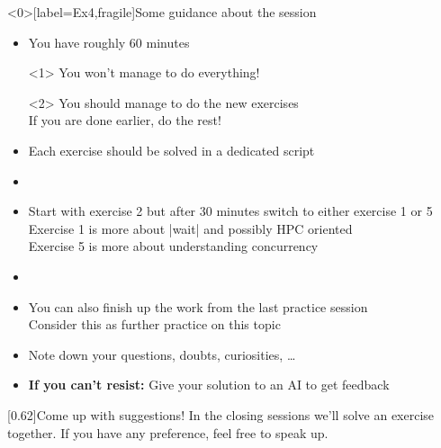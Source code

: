 
\begin{frame}<0>[label=Ex4,fragile]{Some guidance about the session}
    \vspace{-2mm}
    \begin{itemize}
        \item You have roughly 60 minutes\\
              \begin{onlyenv}<1>
                  \then You won't manage to do everything! 
              \end{onlyenv}
              \begin{onlyenv}<2>
                  \then You should manage to do the new exercises\\
                  \then If you are done earlier, do the rest!
              \end{onlyenv}
        \item Each exercise should be solved in a dedicated script
        \item<only@1> 
        \item<only@1> Start with exercise 2 but after 30 minutes switch to either exercise 1 or 5\\
                      \then Exercise 1 is more about \bash|wait| and possibly HPC oriented\\
                      \then Exercise 5 is more about understanding concurrency\\
                      \then {} 
        \item<only@2> 
        \item<only@2> You can also finish up the work from the last practice session\\
                      \then Consider this as further practice on this topic
        \item Note down your questions, doubts, curiosities, \ldots
        \item \alert{\textbf{If you can't resist:} Give your solution to an AI to get feedback} 
    \end{itemize}
    \begin{varblock}{}[0.62\textwidth]{Come up with suggestions!}
        In the closing sessions we'll solve an exercise together.
        If you have any preference, feel free to speak up.
    \end{varblock}
\end{frame}
